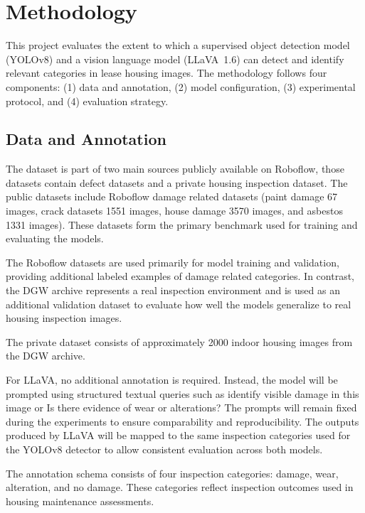 \section{Methodology}
\label{sec:methodology}

This project evaluates the extent to which a supervised object detection model (YOLOv8) and a vision language model (LLaVA~1.6) can detect and identify relevant categories in lease housing images. The methodology follows four components: (1) data and annotation, (2) model configuration, (3) experimental protocol, and (4) evaluation strategy.

\subsection{Data and Annotation}
The dataset is part of two  main sources publicly available on Roboflow\cite{noauthor_roboflow_nodate}, those datasets contain defect datasets and a private housing inspection dataset. The public datasets include Roboflow damage related datasets (paint damage 67 images\cite{hkust_paint_nodate}, crack datasets 1551 images\cite{noauthor_crack_nodate}, house damage 3570 images\cite{noauthor_house_nodate}, and asbestos 1331 images\cite{noauthor_asbestos_nodate}). These datasets form the primary benchmark used for training and evaluating the models.

The Roboflow datasets are used primarily for model training and validation, providing additional labeled examples of damage related categories. In contrast, the DGW archive represents a real inspection environment and is used as an additional validation dataset to evaluate how well the models generalize to real housing inspection images.

The private dataset consists of approximately 2000 indoor housing images from the DGW archive.

For LLaVA, no additional annotation is required. Instead, the model will be prompted using structured textual queries such as identify visible damage in this image or Is there evidence of wear or alterations? The prompts will remain fixed during the experiments to ensure comparability and reproducibility. The outputs produced by LLaVA will be mapped to the same inspection categories used for the YOLOv8 detector to allow consistent evaluation across both models.

The annotation schema consists of four inspection categories: damage, wear, alteration, and no damage. These categories reflect inspection outcomes used in housing maintenance assessments. 

